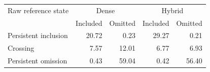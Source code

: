 \begin{tabular}{lrrrr}
\toprule
Raw reference state & \multicolumn{2}{c}{Dense} & \multicolumn{2}{c}{Hybrid} \\
 & Included & Omitted & Included & Omitted \\
\midrule
Persistent inclusion & 20.72 & 0.23 & 29.27 & 0.21 \\
Crossing & 7.57 & 12.01 & 6.77 & 6.93 \\
Persistent omission & 0.43 & 59.04 & 0.42 & 56.40 \\
\bottomrule
\end{tabular}
